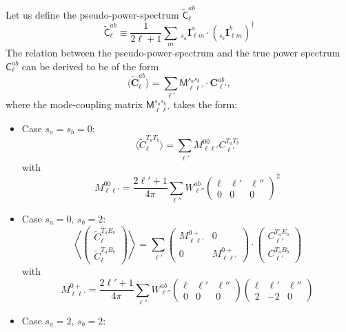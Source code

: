 \documentclass[a4paper,10pt]{article}
\newcommand{\wtj}[6]{\left(\begin{array}{ccc} #1 & #2 & #3\\#4 & #5 & #6\end{array} \right)}
\begin{document}
Let us define the pseudo-power-spectrum $\tilde{\mathsf{C}}^{ab}_\ell$
\begin{equation}
 \tilde{\mathsf{C}}^{ab}_\ell\equiv\frac{1}{2\ell+1}\sum_m\,_{s_a}\mathbf{I}^a_{\ell m}\cdot\left(_{s_b}\mathbf{I}^b_{\ell m}\right)^\dag
\end{equation}
The relation between the pseudo-power-spectrum and the true power spectrum $\mathsf{C}^{ab}_\ell$ can be derived to be of the form
\begin{equation}\label{eq:pcl_gen}
  \langle\tilde{\mathbf{C}}^{ab}_\ell\rangle=\sum_{\ell'}\mathsf{M}^{s_as_b}_{\ell\ell'}\cdot\mathbf{C}^{ab}_{\ell'},
\end{equation}
where the mode-coupling matrix $\mathsf{M}^{s_as_b}_{\ell\ell'}$ takes the form:
\begin{itemize}
 \item Case $s_a=s_b=0$:
 \begin{equation}
   \langle\tilde{C}^{T_aT_b}_\ell\rangle=\sum_{\ell'}M^{00}_{\ell\ell'}C^{T_aT_b}_{\ell'}
 \end{equation}
 with
 \begin{equation}
  M^{00}_{\ell\ell'}=\frac{2\ell'+1}{4\pi}\sum_{\ell''}W^{ab}_{\ell''}\wtj{\ell}{\ell'}{\ell''}{0}{0}{0}^2
 \end{equation}
 \item Case $s_a=0,\,s_b=2$:
 \begin{equation}
   \left\langle\left(\begin{array}{c}
                \tilde{C}^{T_aE_b}_\ell \\ \tilde{C}^{T_aB_b}_\ell
               \end{array}\right)\right\rangle
   =\sum_{\ell'}\left(
   \begin{array}{ll}
    M^{0+}_{\ell\ell'} & 0 \\
    0 & M^{0+}_{\ell\ell'}
   \end{array}\right)\cdot\left(
   \begin{array}{c}
    C^{T_aE_b}_{\ell'}\\ C^{T_aB_b}_{\ell'}
   \end{array}\right)
 \end{equation}
 with
 \begin{equation}
  M^{0+}_{\ell\ell'}=\frac{2\ell'+1}{4\pi}\sum_{\ell''}W^{ab}_{\ell''}\wtj{\ell}{\ell'}{\ell''}{0}{0}{0}\wtj{\ell}{\ell'}{\ell''}{2}{-2}{0}
 \end{equation}
 \item Case $s_a=2,\,s_b=2$:
 \begin{equation}

\end{equation}
\end{itemize}
\end{document}
